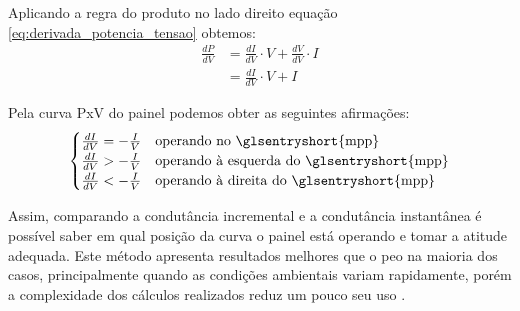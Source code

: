 Aplicando a regra do produto no lado direito equação \ref{eq:derivada_potencia_tensao} obtemos:
\begin{equation}
\begin{aligned}
\frac{dP}{dV} &= \frac{dI}{dV}\cdot V + \frac{dV}{dV}\cdot I \\
&= \frac{dI}{dV}\cdot V + I
\end{aligned}
\end{equation}

Pela curva PxV do painel podemos obter as seguintes afirmações:
\begin{gather*}
\begin{cases}
\frac{dI}{dV} = -\frac{I}{V} & \text{operando no \glsentryshort{mpp}} \\
\frac{dI}{dV} > -\frac{I}{V} & \text{operando à esquerda do \glsentryshort{mpp}} \\
\frac{dI}{dV} < -\frac{I}{V} & \text{operando à direita do \glsentryshort{mpp}}
\end{cases}
\end{gather*}

Assim, comparando a condutância incremental e a condutância instantânea é possível saber em qual posição da curva o painel está operando e tomar a atitude adequada. Este método apresenta resultados melhores que o \gls{peo} na maioria dos casos, principalmente quando as condições ambientais variam rapidamente, porém a complexidade dos cálculos realizados reduz um pouco seu uso \cite{tofoli2015}.